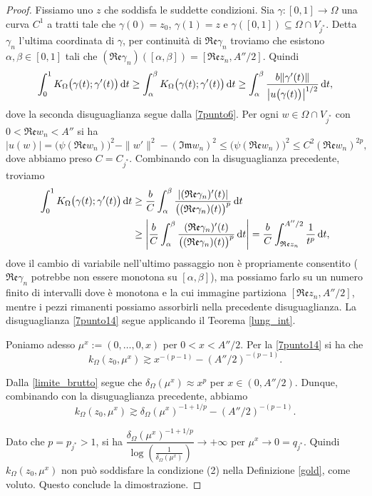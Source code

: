 \begin{proof}
    Fissiamo uno $z$ che soddisfa le suddette condizioni. Sia $\gamma:[0,1]\longrightarrow\Omega$ una curva $C^1$ a tratti tale che $\gamma(0)=z_0$, $\gamma(1)=z$ e $\gamma([0,1])\subseteq\Omega\cap V_{j^*}$. Detta $\gamma_n$ l'ultima coordinata di $\gamma$, per continuità di $\mathfrak{Re}\gamma_n$ troviamo che esistono $\alpha,\beta\in[0,1]$ tali che $(\mathfrak{Re}\gamma_n)([\alpha,\beta])=[\mathfrak{Re}z_n,A''/2]$. Quindi
    $$\int_0^1 K_\Omega\big(\gamma(t);\gamma'(t)\big)\mathop{}\!\mathrm{d} t\ge\int_\alpha^\beta K_\Omega\big(\gamma(t);\gamma'(t)\big)\mathop{}\!\mathrm{d} t\ge \int_\alpha^\beta \frac{b\|\gamma'(t)\|}{\left|u\big(\gamma(t)\big)\right|^{1/2}}\mathop{}\!\mathrm{d} t,$$
    dove la seconda disuguaglianza segue dalla \eqref{7punto6}. Per ogni $w\in\Omega\cap V_{j^*}$ con $0<\mathfrak{Re}w_n<A''$ si ha
    $$|u(w)|=\big(\psi(\mathfrak{Re}w_n)\big)^2-\|w'\|^2-(\mathfrak{Im}w_n)^2 \le \big(\psi(\mathfrak{Re}w_n)\big)^2 \le C^2(\mathfrak{Re}w_n)^{2p},$$
    dove abbiamo preso $C=C_{j^*}$. Combinando con la disuguaglianza precedente, troviamo
    \begin{align*}
        \int_0^1 K_\Omega\big(\gamma(t);\gamma'(t)\big)\mathop{}\!\mathrm{d} t&\ge \frac{b}{C}\int_\alpha^\beta \frac{|(\mathfrak{Re}\gamma_n)'(t)|}{\big((\mathfrak{Re}\gamma_n)(t)\big)^p}\mathop{}\!\mathrm{d} t\\
        &\ge \left|\frac{b}{C}\int_\alpha^\beta \frac{(\mathfrak{Re}\gamma_n)'(t)}{\big((\mathfrak{Re}\gamma_n)(t)\big)^p}\mathop{}\!\mathrm{d} t\right|=\frac{b}{C}\int_{\mathfrak{Re}z_n}^{A''/2}\frac{1}{t^p}\mathop{}\!\mathrm{d} t,
    \end{align*}
    dove il cambio di variabile nell'ultimo passaggio non è propriamente consentito ($\mathfrak{Re}\gamma_n$ potrebbe non essere monotona su $[\alpha,\beta]$), ma possiamo farlo su un numero finito di intervalli dove è monotona e la cui immagine partiziona $[\mathfrak{Re}z_n,A''/2]$, mentre i pezzi rimanenti possiamo assorbirli nella precedente disuguaglianza. La disuguaglianza \eqref{7punto14} segue applicando il Teorema \ref{lung_int}.

    Poniamo adesso $\mu^x:=(0,\dots,0,x)$ per $0<x<A''/2$. Per la \eqref{7punto14} si ha che
    $$k_\Omega(z_0,\mu^x) \gtrsim x^{-(p-1)}-(A''/2)^{-(p-1)}.$$
    
    Dalla \eqref{limite_brutto} segue che $\delta_\Omega(\mu^x) \approx x^p$ per $x\in(0,A''/2)$. Dunque, combinando con la disuguaglianza precedente, abbiamo
    $$k_\Omega(z_0,\mu^x) \gtrsim \delta_\Omega(\mu^x)^{-1+1/p}-(A''/2)^{-(p-1)}.$$

    Dato che $p=p_{j^*}>1$, si ha $\dfrac{\delta_\Omega(\mu^x)^{-1+1/p}}{\log\left(\frac{1}{\delta_\Omega(\mu^x)}\right)}\longrightarrow +\infty$ per $\mu^x\longrightarrow 0=q_{j^*}$. Quindi $k_\Omega(z_0,\mu^x)$ non può soddisfare la condizione (2) nella Definizione \ref{gold}, come voluto. Questo conclude la dimostrazione.
\end{proof}

